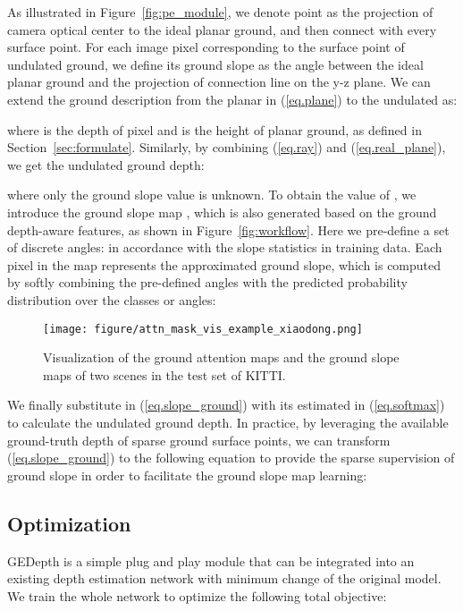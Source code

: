 \documentclass[10pt,twocolumn,letterpaper]{article}
\begin{document}
As illustrated in Figure~\ref{fig:pe_module}, we denote point  as the projection of camera optical center to the ideal planar ground, and then connect  with every surface point. For each image pixel  corresponding to the surface point of undulated ground, we define its ground slope as the angle  between the ideal planar ground and the projection of connection line on the y-z plane. We can extend the ground description from the planar in (\ref{eq.plane}) to the undulated as:

where  is the depth of pixel  and  is the height of planar ground, as defined in Section~\ref{sec:formulate}. Similarly, by combining (\ref{eq.ray}) and (\ref{eq.real_plane}), we get the undulated ground depth:

where only the ground slope value  is unknown. To obtain the value of , we introduce the ground slope map , which is also generated based on the ground depth-aware features, as shown in Figure~\ref{fig:workflow}. Here we pre-define a set of  discrete angles:  in accordance with the slope statistics in training data. Each pixel in the map represents the approximated ground slope, which is computed by softly combining the pre-defined angles with the predicted probability distribution  over the  classes or angles:

\begin{figure*}[t]
 \begin{center}
\texttt{[image: figure/attn\_mask\_vis\_example\_xiaodong.png]}
\end{center}
 \caption{Visualization of the ground attention maps and the ground slope maps of two scenes in the test set of KITTI.
 }
\label{fig:attn_mask_vis_example}
\end{figure*}
\hspace{-1mm}We finally substitute  in (\ref{eq.slope_ground}) with its estimated  in (\ref{eq.softmax}) to calculate the undulated ground depth. In practice, by leveraging the available ground-truth depth of sparse ground surface points, we can transform (\ref{eq.slope_ground}) to the following equation to provide the sparse supervision of ground slope in order to facilitate the ground slope map learning:


\subsection{Optimization}
GEDepth is a simple plug and play module that can be integrated into an existing depth estimation network with minimum change of the original model. We train the whole network to optimize the following total objective:
\end{document}
